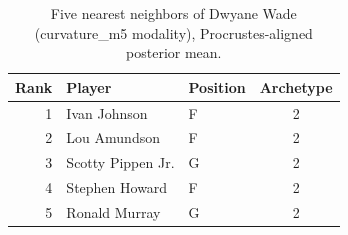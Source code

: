 \begin{table}[htbp]
  \centering\small
  \begin{tabular}{rllc}
    \toprule
    Rank & Player & Position & Archetype \\
    \midrule
    1 & Ivan Johnson & F & 2 \\
    2 & Lou Amundson & F & 2 \\
    3 & Scotty Pippen Jr. & G & 2 \\
    4 & Stephen Howard & F & 2 \\
    5 & Ronald Murray & G & 2 \\
    \bottomrule
  \end{tabular}
  \caption{Five nearest neighbors of Dwyane Wade (curvature_m5 modality), Procrustes-aligned posterior mean.}
  \label{tab:Dwyane_Wade_neighbors_curvature_m5}
\end{table}

